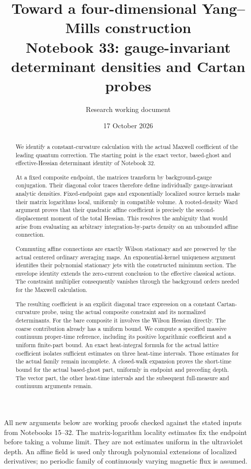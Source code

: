 \documentclass[11pt]{article}
\title{Toward a four-dimensional Yang--Mills construction\\
\large Notebook 33: gauge-invariant determinant densities and Cartan probes}
\author{Research working document}
\date{17 October 2026}
\theoremstyle{remark}
\begin{document}
\maketitle
\begin{abstract}
We identify a constant-curvature calculation with the actual
Maxwell coefficient of the leading quantum correction.
The starting point is the exact vector, based-ghost and
effective-Hessian determinant identity of Notebook 32.

At a fixed composite endpoint, the matrices transform by
background-gauge conjugation. Their diagonal color traces
therefore define individually gauge-invariant analytic
densities. Fixed-endpoint gaps and exponentially localized
source kernels make their matrix logarithms local, uniformly
in compatible volume. A rooted-density Ward argument proves
that their quadratic affine coefficient is precisely the
second-displacement moment of the total Hessian. This
resolves the ambiguity that would arise from evaluating
an arbitrary integration-by-parts density on an unbounded
affine connection.

Commuting affine connections are exactly Wilson stationary
and are preserved by the actual centered ordinary averaging
maps. An exponential-kernel uniqueness argument identifies
their polynomial stationary jets with the constructed
minimum section. The envelope identity extends the
zero-current conclusion to the effective classical actions.
The constraint multiplier consequently vanishes through
the background orders needed for the Maxwell calculation.

The resulting coefficient is an explicit diagonal trace
expression on a constant Cartan-curvature probe, using
the actual composite constraint and its normalized
determinants. For the bare composite it involves the
Wilson Hessian directly. The coarse contribution already
has a uniform bound. We compute a specified massive
continuum proper-time reference, including its positive
logarithmic coefficient and a uniform finite-part bound.
An exact heat-integral formula for the actual lattice
coefficient isolates sufficient estimates on three
heat-time intervals. Those estimates for the actual
family remain incomplete. A closed-walk expansion proves
the short-time bound for the actual based-ghost part,
uniformly in endpoint and preceding depth. The vector
part, the other heat-time intervals and the subsequent
full-measure and continuum arguments remain.
\end{abstract}

All new arguments below are working proofs checked against
the stated inputs from Notebooks 15--32. The matrix-logarithm
locality estimates fix the endpoint before taking a volume
limit. They are not estimates uniform in the ultraviolet
depth. An affine field is used only through polynomial
extensions of localized derivatives; no periodic family
of continuously varying magnetic flux is assumed.
\end{document}
